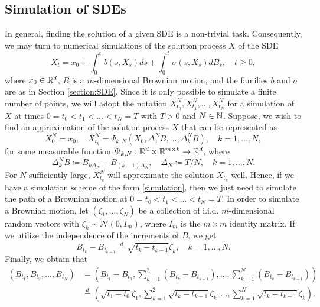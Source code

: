 \subsection{Simulation of SDEs}
In general, finding the solution of a given SDE is a non-trivial task. Consequently, we may turn to numerical simulations of the solution process $X$ of the SDE
\begin{equation}
    X_{t}=x_{0} + \int_{0}^{t}b(s,X_{s})ds + \int_{0}^{t}\sigma(s,X_{s})dB_{s}, \quad t\geq 0,
\end{equation}
where $x_{0}\in \mathbb{R}^{d}$, $B$ is a $m$-dimensional Brownian motion, and the families $b$ and $\sigma$ are as in Section \ref{section:SDE}. Since it is only possible to simulate a finite number of points, we will adopt the notation $X_{t_{0}}^{N},X_{t_{1}}^{N},\dots,X_{t_{N}}^{N}$ for a simulation of $X$ at times $0=t_{0}<t_{1}<\dots <t_{N}=T$ with $T>0$ and $N\in \mathbb{N}$. Suppose, we wish to find an approximation of the solution process $X$ that can be represented as
\begin{equation}\label{simulation}
    X_{0}^{N}=x_{0},\quad X_{t_{k}}^{N}=\Psi_{k,N}(X_{0},\Delta_{1}^{N}B,\dots,\Delta_{k}^{N}B), \quad k=1,\dots,N,
\end{equation}
for some measurable function $\Psi_{k,N}:\mathbb{R}^{d}\times \mathbb{R}^{m\times k}\to \mathbb{R}^{d}$, where 
\begin{equation}
    \Delta_{k}^{N}B\coloneqq B_{k\Delta_{N}}-B_{(k-1)\Delta_{N}}, \quad \Delta_{N}\coloneqq T/N, \quad k=1,\dots, N.
\end{equation}
For $N$ sufficiently large, $X_{t_{k}}^{N}$ will approximate the solution $X_{t_{k}}$ well. Hence, if we have a simulation scheme of the form \eqref{simulation}, then we just need to simulate the path of a Brownian motion at $0=t_{0}<t_{1}<\dots<t_{N}=T$. In order to simulate a Brownian motion, let $(\zeta_{1},\dots,\zeta_{N})$ be a collection of i.i.d. $m$-dimensional random vectors with $\zeta_{k}\sim \mathcal{N}(0,I_{m})$, where $I_m$ is the $m\times m$ identity matrix. If we utilize the independence of the increments of $B$, we get
\begin{equation}
    B_{t_{k}}-B_{t_{k-1}}\overset{d}{=} \sqrt{t_{k}-t_{k-1}}\zeta_{k},\quad k=1,\dots,N.
\end{equation}
Finally, we obtain that
\begin{align}
    (B_{t_{1}},B_{t_{2}},\dots,B_{t_{N}})&= (B_{t_{1}}-B_{t_{0}}, \sum_{k=1}^{2}(B_{t_{k}}-B_{t_{k-1}}),\dots, \sum_{k=1}^{N}(B_{t_{k}}-B_{t_{k-1}}))\\
    &\overset{d}{=}(\sqrt{t_{1}-t_{0}}\zeta_{1},\sum_{k=1}^{2}\sqrt{t_{k}-t_{k-1}}\zeta_{k},\dots,\sum_{k=1}^{N}\sqrt{t_{k}-t_{k-1}}\zeta_{k}).
\end{align}
